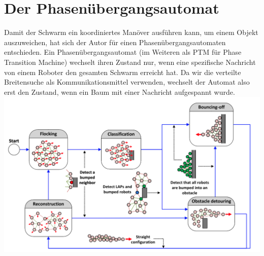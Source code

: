 \section{Der Phasenübergangsautomat}

Damit der Schwarm ein koordiniertes Manöver ausführen kann, um einem Objekt auszuweichen, hat sich der
Autor für einen Phasenübergangsautomaten entschieden. Ein Phasenübergangsautomat (im Weiteren als PTM 
für Phase Transition Machine) wechselt ihren Zustand nur, wenn eine spezifische Nachricht von einem
Roboter den gesamten Schwarm erreicht hat. Da wir die verteilte Breitensuche als Kommunikationsmittel
verwenden, wechselt der Automat also erst den Zustand, wenn ein Baum mit einer Nachricht aufgespannt wurde.\\

\includegraphics[width=5.5in]{images/Screenshot 2023-02-20 at 1.02.59 PM.png}